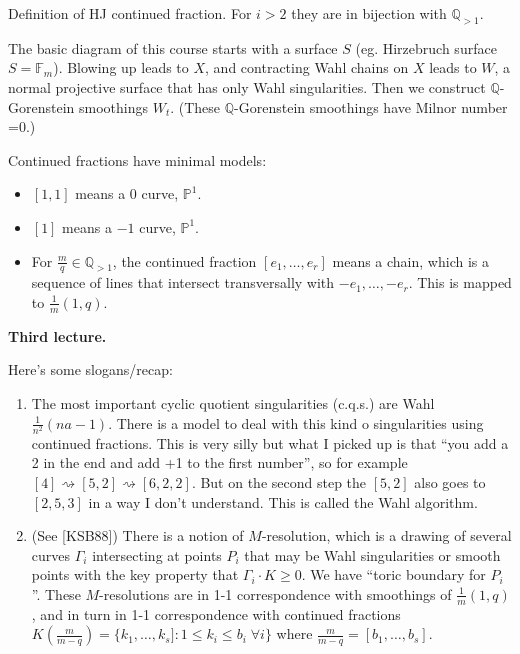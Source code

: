 Definition of HJ continued fraction. For $i>2$ they are in bijection with
$\mathbb{Q}_{>1}$.

The basic diagram of this course starts with a surface $S$ (eg. Hirzebruch
surface $S=\mathbb{F}_m$). Blowing up leads to $X$, and contracting Wahl chains
on $X$ leads to $W$, a normal projective surface that has only Wahl
singularities. Then we construct $\mathbb{Q}$-Gorenstein smoothings $W_t$.
(These  $\mathbb{Q}$-Gorenstein smoothings have Milnor number =0.)

Continued fractions have minimal models:
\begin{itemize}
\item $[1,1]$ means a 0 curve,  $\mathbb{P}^1$.
\item $[1]$ means a  $-1$ curve,  $\mathbb{P}^1$.
\item For $\frac{m}{q}\in\mathbb{Q}_{>1}$, the continued fraction
$[e_1,\ldots,e_r]$ means a chain, which is a sequence of lines that intersect
transversally with $-e_1,\ldots,-e_r$. This is mapped to $\frac{1}{m}(1,q)$.
\end{itemize}

\medskip\noindent

{\bf Third lecture.}

Here's some slogans/recap:
\begin{enumerate}
\item The most important cyclic quotient singularities (c.q.s.) are Wahl
$\frac{1}{n^2}(na-1)$. There is a model to deal with this kind o singularities
using continued fractions. This is very silly but what I picked up is that ``you
add a 2 in the end and add +1 to the first number'', so for example
$[4]\rightsquigarrow[5,2]\rightsquigarrow[6,2,2]$. But on the second step the
$[5,2]$ also goes to $[2,5,3]$ in a way I don't understand. This is called the
Wahl algorithm.
\item (See [KSB88]) There is a notion of $M$-resolution, which is a drawing of 
several curves $\Gamma_i$ intersecting at points $P_i$ that may be Wahl 
singularities or 
smooth points with the key property that $\Gamma_i\cdot K\geq 0$. We have
``toric boundary for $P_i$''. These $M$-resolutions are in 1-1 correspondence
with smoothings of $\frac{1}{m}(1,q)$, and in turn in 1-1 correspondence with
continued fractions $K\left(\frac{m}{m-q}\right)=\{k_1,\ldots,k_s]:
1\leq k_i\leq b_i\;\forall i\}$ where $\frac{m}{m-q}=[b_1,\ldots,b_s]$.
\end{enumerate}

\medskip\noindent

